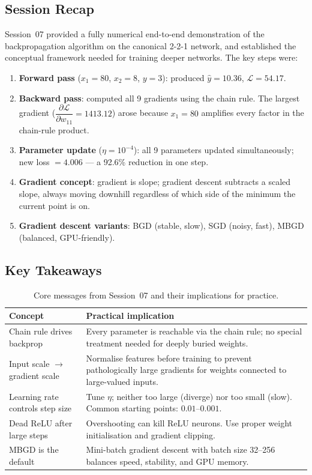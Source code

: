 \documentclass[12pt,a4paper]{article}
\newcommand{\Loss}{\mathcal{L}}
\newcommand{\yhat}{\hat{y}}
\newcommand{\pderiv}[2]{\dfrac{\partial #1}{\partial #2}}
\begin{document}
\subsection{Session Recap}

Session~07 provided a fully numerical end-to-end demonstration of the
backpropagation algorithm on the canonical 2-2-1 network, and established the
conceptual framework needed for training deeper networks.
The key steps were:

\begin{enumerate}[leftmargin=2em,label=\textbf{\arabic*.}]
  \item \textbf{Forward pass} ($x_1=80$, $x_2=8$, $y=3$): produced
        $\yhat = 10.36$, $\Loss = 54.17$.
  \item \textbf{Backward pass}: computed all 9 gradients using the chain
        rule.  The largest gradient ($\pderiv{\Loss}{w_{11}} = 1413.12$) arose
        because $x_1 = 80$ amplifies every factor in the chain-rule product.
  \item \textbf{Parameter update} ($\eta = 10^{-4}$): all 9 parameters
        updated simultaneously; new loss $= 4.006$ --- a 92.6\% reduction in
        one step.
  \item \textbf{Gradient concept}: gradient is slope; gradient descent
        subtracts a scaled slope, always moving downhill regardless of which
        side of the minimum the current point is on.
  \item \textbf{Gradient descent variants}: BGD (stable, slow), SGD (noisy,
        fast), MBGD (balanced, GPU-friendly).
\end{enumerate}

\subsection{Key Takeaways}

\begin{table}[ht]
\centering
\caption{Core messages from Session~07 and their implications for practice.}
\label{tab:takeaways}
\begin{tabularx}{\linewidth}{p{4cm}X}
\toprule
\textbf{Concept} & \textbf{Practical implication} \\
\midrule
Chain rule drives backprop &
  Every parameter is reachable via the chain rule; no special treatment
  needed for deeply buried weights. \\[4pt]
Input scale $\to$ gradient scale &
  Normalise features before training to prevent pathologically large
  gradients for weights connected to large-valued inputs. \\[4pt]
Learning rate controls step size &
  Tune $\eta$; neither too large (diverge) nor too small (slow).
  Common starting points: $0.01$--$0.001$. \\[4pt]
Dead ReLU after large steps &
  Overshooting can kill ReLU neurons.
  Use proper weight initialisation and gradient clipping. \\[4pt]
MBGD is the default &
  Mini-batch gradient descent with batch size 32--256 balances
  speed, stability, and GPU memory. \\
\bottomrule
\end{tabularx}
\end{table}
\end{document}
